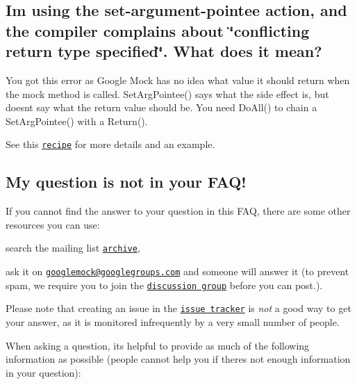 \subsection*{I\textquotesingle{}m using the set-\/argument-\/pointee action, and the compiler complains about \char`\"{}conflicting return type specified\char`\"{}. What does it mean?}

You got this error as Google Mock has no idea what value it should return when the mock method is called. {\ttfamily Set\+Arg\+Pointee()} says what the side effect is, but doesn\textquotesingle{}t say what the return value should be. You need {\ttfamily Do\+All()} to chain a {\ttfamily Set\+Arg\+Pointee()} with a {\ttfamily Return()}.

See this \href{CookBook.md#mocking_side_effects}{\tt recipe} for more details and an example.

\subsection*{My question is not in your F\+A\+Q!}

If you cannot find the answer to your question in this F\+AQ, there are some other resources you can use\+:


\begin{DoxyEnumerate}
\item search the mailing list \href{http://groups.google.com/group/googlemock/topics}{\tt archive},
\end{DoxyEnumerate}
\begin{DoxyEnumerate}
\item ask it on \href{mailto:googlemock@googlegroups.com}{\tt googlemock@googlegroups.\+com} and someone will answer it (to prevent spam, we require you to join the \href{http://groups.google.com/group/googlemock}{\tt discussion group} before you can post.).
\end{DoxyEnumerate}

Please note that creating an issue in the \href{https://github.com/google/googletest/issues}{\tt issue tracker} is {\itshape not} a good way to get your answer, as it is monitored infrequently by a very small number of people.

When asking a question, it\textquotesingle{}s helpful to provide as much of the following information as possible (people cannot help you if there\textquotesingle{}s not enough information in your question)\+:


